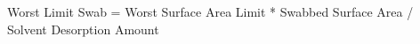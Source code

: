 Worst Limit Swab = Worst Surface Area Limit * Swabbed Surface Area / Solvent Desorption Amount\relax